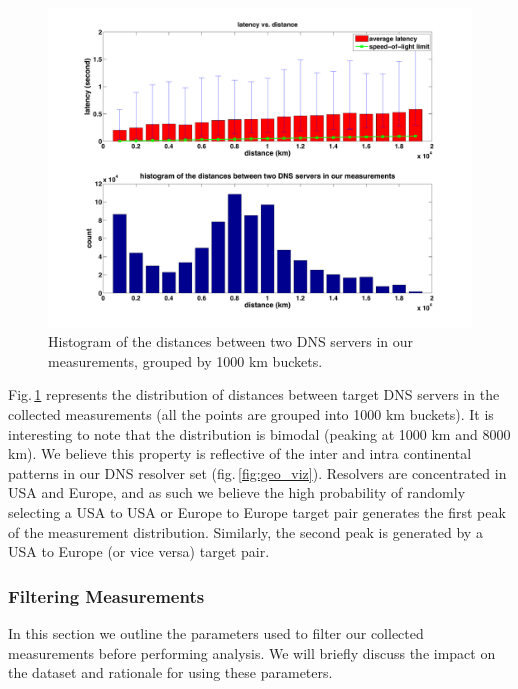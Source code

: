 \begin{figure}
  \centering
  \includegraphics[width=\linewidth]{../figs/King_distance_distrbution.pdf}
  \vspace{-1em}
  \caption{Histogram of the distances between two DNS servers in our measurements, grouped by 1000 km buckets.}
  \label{fig:latency_distance_distribution}
\end{figure}

Fig.\,\ref{fig:latency_distance_distribution} represents the distribution of distances between target DNS servers in the collected measurements (all the points are grouped into 1000 km buckets). It is interesting to note that the distribution is bimodal (peaking at 1000 km and 8000 km). We believe this property is reflective of the inter and intra continental patterns in our DNS resolver set (fig.\,\ref{fig:geo_viz}). Resolvers are concentrated in USA and Europe, and as such we believe the high probability of randomly selecting a USA to USA or Europe to Europe target pair generates the first peak of the measurement distribution. Similarly, the second peak is generated by a USA to Europe (or vice versa) target pair.

\subsubsection{Filtering Measurements}
In this section we outline the parameters used to filter our collected measurements before performing analysis. We will briefly discuss the impact on the dataset and rationale for using these parameters.

